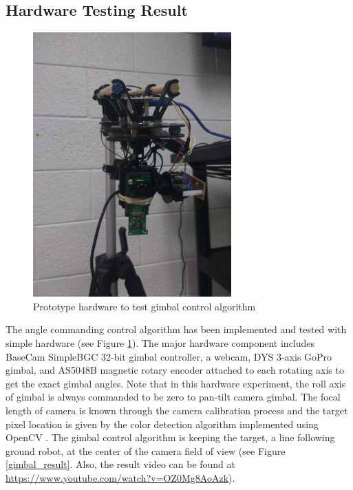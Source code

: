 \subsection{Hardware Testing Result}
\begin{figure}[t]
	\centering
	\includegraphics[width = 3in]{images/chapter2/gimbal_webcam.jpg}
	\caption{Prototype hardware to test gimbal control algorithm}
	\label{gimbal_webcam}
\end{figure}
The angle commanding control algorithm has been implemented and tested with simple hardware (see Figure \ref{gimbal_webcam}). The major hardware component includes BaseCam SimpleBGC 32-bit gimbal controller, a webcam, DYS 3-axis GoPro gimbal, and AS5048B magnetic rotary encoder attached to each rotating axis to get the exact gimbal angles. Note that in this hardware experiment, the roll axis of gimbal is always commanded to be zero to pan-tilt camera gimbal. The focal length of camera is known through the camera calibration process and the target pixel location is given by the color detection algorithm implemented using OpenCV \cite{itseez2015opencv}. The gimbal control algorithm is keeping the target, a line following ground robot, at the center of the camera field of view (see Figure \ref{gimbal_result}. Also, the result video can be found at \href{https://www.youtube.com/watch?v=OZ0Mg8AoAzk}{https://www.youtube.com/watch?v=OZ0Mg8AoAzk}). 

